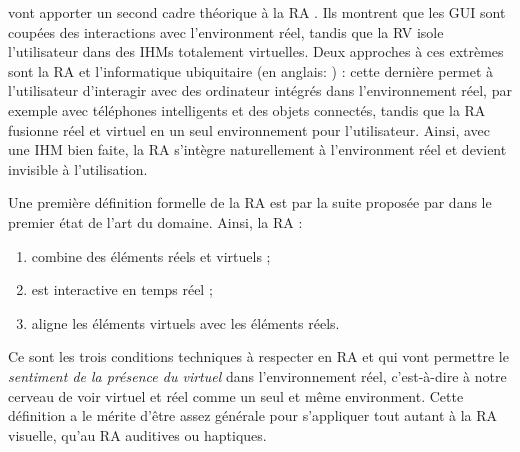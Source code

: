 
\cite{Rekimoto1995} vont apporter un second cadre théorique à la RA . Ils montrent que les GUI sont coupées des interactions avec l'environment réel, tandis que la RV isole l'utilisateur dans des IHMs totalement virtuelles. Deux approches à ces extrèmes sont la RA et l'informatique ubiquitaire (en anglais: ) : cette dernière permet à l'utilisateur d'interagir avec des ordinateur intégrés dans l'environnement réel, par exemple avec téléphones intelligents et des objets connectés, tandis que la RA fusionne réel et virtuel en un seul environnement pour l'utilisateur. Ainsi, avec une IHM bien faite, la RA s'intègre naturellement à l'environment réel et devient invisible à l'utilisation.


Une première définition formelle de la RA est par la suite proposée par \cite{Azuma1997} dans le premier état de l'art du domaine. Ainsi, la RA :
\begin{enumerate}
  \item combine des éléments réels et virtuels ;
  \item est interactive en temps réel ;
  \item aligne les éléments virtuels avec les éléments réels.
\end{enumerate}
Ce sont les trois conditions techniques à respecter en RA et qui vont permettre le \emph{sentiment de la présence du virtuel} dans l'environnement réel, c'est-à-dire à notre cerveau de voir virtuel et réel comme un seul et même environment. Cette définition a le mérite d'être assez générale pour s'appliquer tout autant à la RA visuelle, qu'au RA auditives ou haptiques.

